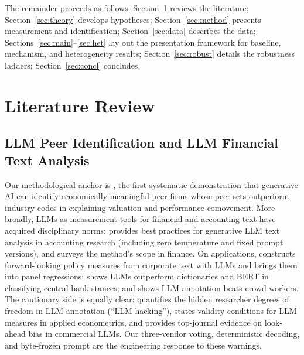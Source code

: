 The remainder proceeds as follows. Section~\ref{sec:lit} reviews the literature;
Section~\ref{sec:theory} develops hypotheses; Section~\ref{sec:method} presents measurement
and identification; Section~\ref{sec:data} describes the data;
Sections~\ref{sec:main}--\ref{sec:het} lay out the presentation framework for baseline,
mechanism, and heterogeneity results; Section~\ref{sec:robust} details the robustness ladders;
Section~\ref{sec:concl} concludes.

\section{Literature Review}\label{sec:lit}

\subsection{LLM Peer Identification and LLM Financial Text Analysis}
Our methodological anchor is \textcite{cao2025genai}, the first systematic demonstration that
generative AI can identify economically meaningful peer firms whose peer sets outperform
industry codes in explaining valuation and performance comovement. More broadly, LLMs as
measurement tools for financial and accounting text have acquired disciplinary norms:
\textcite{dekok2025chatgpt} provides best practices for generative LLM text analysis in
accounting research (including zero temperature and fixed prompt versions), and
\textcite{eisfeldt2025genai} surveys the method's scope in finance. On applications,
\textcite{jha2024chatgpt} constructs forward-looking policy measures from corporate text with
LLMs and brings them into panel regressions; \textcite{hansen2023fedspeak} shows LLMs
outperform dictionaries and BERT in classifying central-bank stances; and
\textcite{gilardi2023chatgpt} shows LLM annotation beats crowd workers. The cautionary side is
equally clear: \textcite{baumann2025llmhacking} quantifies the hidden researcher degrees of
freedom in LLM annotation (``LLM hacking''), \textcite{ludwig2025llmframework} states validity
conditions for LLM measures in applied econometrics, and \textcite{levy2026lookahead} provides
top-journal evidence on look-ahead bias in commercial LLMs. Our three-vendor voting,
deterministic decoding, and byte-frozen prompt are the engineering response to these warnings.

